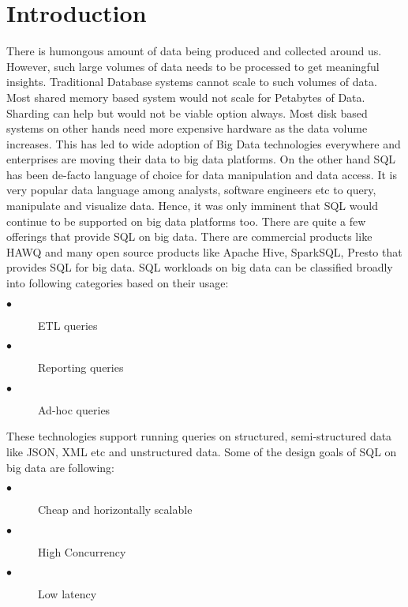 \section{Introduction}

There is humongous amount of data being produced and collected around us.
However, such large volumes of data needs to be processed to get meaningful insights.
Traditional Database systems cannot scale to such volumes of data.
Most shared memory based system would not scale for Petabytes of Data. 
Sharding can help but would not be viable option always. 
Most disk based systems on other hands need more expensive hardware as the data volume increases.
This has led to wide adoption of Big Data technologies everywhere and enterprises are moving their 
data to big data platforms. On the other hand SQL has been de-facto language of choice for 
data manipulation and data access. It is very popular data language among analysts, 
software engineers etc to query, manipulate and visualize data. Hence, it was only imminent that 
SQL would continue to be supported on big data platforms too. 
There are quite a few offerings that provide SQL on big data. There are commercial products like HAWQ and many open source products like Apache Hive, SparkSQL, Presto that provides SQL for big data. SQL workloads on big data can be classified broadly into following categories based on their usage:
\begin{description}
  \item[$\bullet$] ETL queries
  \item[$\bullet$] Reporting queries
  \item[$\bullet$] Ad-hoc queries
\end{description}

These technologies support running queries on structured, semi-structured data like JSON, XML etc and unstructured data. Some of the design goals of SQL on big data are following:
\begin{description}
  \item[$\bullet$] Cheap and horizontally scalable
  \item[$\bullet$] High Concurrency
  \item[$\bullet$] Low latency
\end{description}



